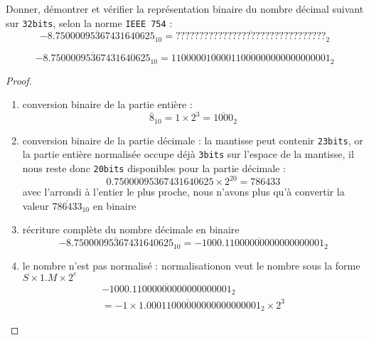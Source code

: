 \documentclass[12pt,a4paper,oneside,titlepage,final]{exam}
\begin{document}
\begin{questions}
    \question[20] Donner, démontrer et vérifier la repr\'esentation
    binaire du nombre d\'ecimal suivant sur \lstinline{32bits}, selon
    la norme \texttt{\acrshort{IEEE} 754}\cite{IEEE754_WIKIPEDIA} :
        $$ \overline{-8.75000095367431640625}_{10} = \overline{????????????????????????????????}_{2} $$
        \begin{solution}[30cm]
                $$ \overline{-8.75000095367431640625}_{10} = \overline{11000001000011000000000000000001}_{2} $$
                \begin{proof}~\newline
                    \begin{enumerate}
                        \item conversion binaire de la partie
                        enti\`ere :
                    $$ \overline{8}_{10} = 1 \times 2^{3} = \overline{1000}_{2}$$
                    \item conversion binaire de la partie d\'ecimale :
                    \subitem la mantisse peut contenir
                    \lstinline{23bits}, or la partie enti\`ere
                    normalis\'ee occupe d\'ej\`a \lstinline{3bits} sur
                    l'espace de la mantisse, il nous reste donc
                    \lstinline{20bits} disponibles pour la partie
                    d\'ecimale : $$ 0.75000095367431640625 \times
                    2^{20} = 786433 $$ avec l'arrondi \`a l'entier le
                    plus proche, \subitem nous n'avons plus qu'\`a
                    convertir la valeur $ \overline{786433}_{10} $ en
                    binaire 
                    \item r\'ecriture compl\`ete du nombre d\'ecimale
                    en binaire
                        $$ \overline{-8.75000095367431640625}_{10} = \overline{-1000.11000000000000000001}_{2}$$
                        \item le nombre n'est pas normalis\'e :
                        normalisation\newline on veut le nombre sous
                        la forme $ S \times 1.M \times 2^{e} $
                        \begin{multline}
                            \overline{-1000.11000000000000000001}_{2}
                            \\= \overline{-1 \times
                              1.00011000000000000000001}_{2} \times
                            2^{3}
                        \end{multline}

\end{enumerate}
\end{proof}
\end{solution}
\end{questions}
\end{document}
